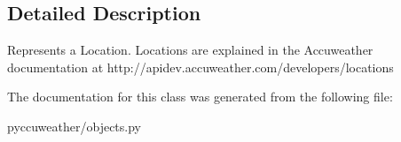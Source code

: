 \subsection{Detailed Description}
\begin{DoxyVerb}Represents a Location.
Locations are explained in the Accuweather documentation at http://apidev.accuweather.com/developers/locations
\end{DoxyVerb}
 

The documentation for this class was generated from the following file\+:\begin{DoxyCompactItemize}
\item 
pyccuweather/objects.\+py\end{DoxyCompactItemize}
